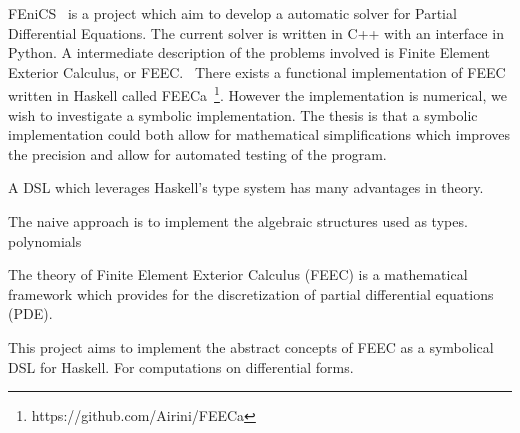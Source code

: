 \documentclass{scrartcl}
\begin{document}
FEniCS~\cite{AlnaesBlechta2015a} is a project which aim to develop a automatic
solver for Partial Differential Equations. The current solver is written in C++
with an interface in Python. A intermediate description of the problems
involved is Finite Element Exterior Calculus, or FEEC.~\cite{arnold2006finite}
There exists a functional implementation of FEEC written in Haskell called
FEECa~\footnote{https://github.com/Airini/FEECa}.  However the implementation
is numerical, we wish to investigate a symbolic implementation.  The thesis is
that a symbolic implementation could both allow for mathematical
simplifications which improves the precision and allow for automated testing of
the program.






A DSL which leverages Haskell's type system has many advantages in theory.

The naive approach is to implement the algebraic structures used as types.
polynomials


The theory of Finite Element Exterior Calculus (FEEC) is a mathematical
framework which provides for the discretization of partial differential
equations (PDE).

This project aims to implement the abstract concepts of FEEC as a symbolical
DSL for Haskell. For computations on differential forms.
\end{document}
